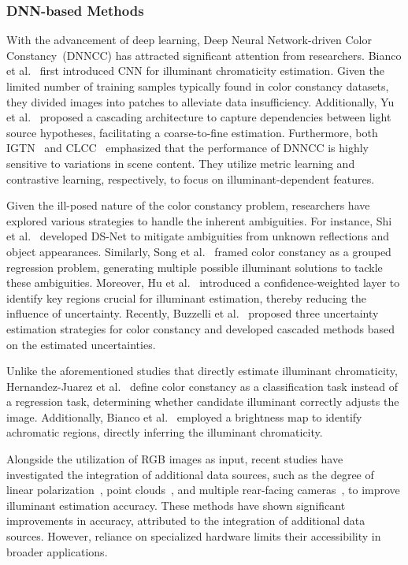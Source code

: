 \subsubsection{DNN-based Methods} \label{sec2.2.2}
\par With the advancement of deep learning, Deep Neural Network-driven Color Constancy~(DNNCC) has attracted significant attention from researchers.
Bianco et al.~\cite{bianco2015color} first introduced CNN for illuminant chromaticity estimation. Given the limited number of training samples typically found in color constancy datasets, they divided images into patches to alleviate data insufficiency.
Additionally, Yu et al.~\cite{yu2020cascading} proposed a cascading architecture to capture dependencies between light source hypotheses, facilitating a coarse-to-fine estimation. Furthermore, both IGTN~\cite{xu2020end} and CLCC~\cite{lo2021clcc} emphasized that the performance of DNNCC is highly sensitive to variations in scene content. They utilize metric learning and contrastive learning, respectively, to focus on illuminant-dependent features. 
\par Given the ill-posed nature of the color constancy problem, researchers have explored various strategies to handle the inherent ambiguities. For instance, Shi et al.~\cite{shi2016deep} developed DS-Net to mitigate ambiguities from unknown reflections and object appearances. Similarly, Song et al.~\cite{hu2017fc4} framed color constancy as a grouped regression problem, generating multiple possible illuminant solutions to tackle these ambiguities. Moreover, Hu et al.~\cite{hu2017fc4} introduced a confidence-weighted layer to identify key regions crucial for illuminant estimation, thereby reducing the influence of uncertainty. Recently, Buzzelli et al.~\cite{buzzelli2024uncertainty} proposed three uncertainty estimation strategies for color constancy and developed cascaded methods based on the estimated uncertainties.
\par Unlike the aforementioned studies that directly estimate illuminant chromaticity, Hernandez-Juarez et al.~\cite{hernandez2020multi} define color constancy as a classification task instead of a regression task, determining whether candidate illuminant correctly adjusts the image. 
Additionally, Bianco et al.~\cite{bianco2019quasi} employed a brightness map to identify achromatic regions, directly inferring the illuminant chromaticity.
\par Alongside the utilization of RGB images as input, recent studies have investigated the integration of additional data sources, such as the degree of linear polarization~\cite{xing2022point}, point clouds~\cite{xing2022point}, and multiple rear-facing cameras~\cite{abdelhamed2021leveraging}, to improve illuminant estimation accuracy. These methods have shown significant improvements in accuracy, attributed to the integration of additional data sources. However, reliance on specialized hardware limits their accessibility in broader applications.
